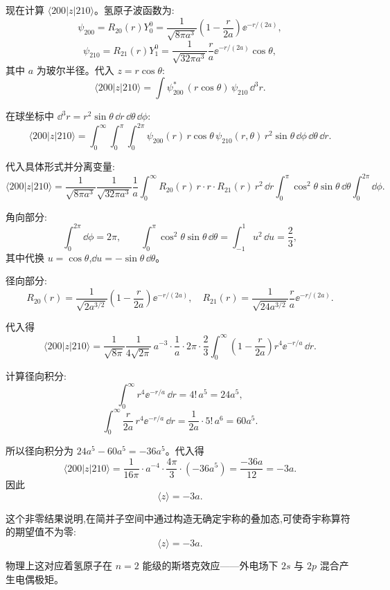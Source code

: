 \begin{solution}
	现在计算 $\langle200|z|210\rangle$。氢原子波函数为:
	\[
	\psi_{200} = R_{20}(r)Y_0^0 = \frac{1}{\sqrt{8\pi a^3}}\left(1-\frac{r}{2a}\right)\ee^{-r/(2a)},
	\]
	\[
	\psi_{210} = R_{21}(r)Y_1^0 = \frac{1}{\sqrt{32\pi a^3}}\frac{r}{a}\ee^{-r/(2a)}\cos\theta,
	\]
	其中 $a$ 为玻尔半径。代入 $z=r\cos\theta$:
	\[
	\langle200|z|210\rangle = \int \psi_{200}^*\,(r\cos\theta)\,\psi_{210}\,\dd^3 r.
	\]

	在球坐标中 $\dd^3 r = r^2\sin\theta\,\dd r\,\dd\theta\,\dd\phi$:
	\[
	\langle200|z|210\rangle = \int_0^\infty\!\!\int_0^\pi\!\!\int_0^{2\pi}
	\psi_{200}(r)\,r\cos\theta\,\psi_{210}(r,\theta)\,r^2\sin\theta\,\dd\phi\,\dd\theta\,\dd r.
	\]

	代入具体形式并分离变量:
	\[
	\langle200|z|210\rangle = \frac{1}{\sqrt{8\pi a^3}}\frac{1}{\sqrt{32\pi a^3}}\frac{1}{a}
	\int_0^\infty R_{20}(r)\,r\cdot r\cdot R_{21}(r)\,r^2\,\dd r
	\int_0^\pi \cos^2\theta\sin\theta\,\dd\theta
	\int_0^{2\pi}\dd\phi.
	\]

	角向部分:
	\[
	\int_0^{2\pi}\dd\phi = 2\pi,\qquad
	\int_0^\pi \cos^2\theta\sin\theta\,\dd\theta = \int_{-1}^{1}u^2\,\dd u = \frac23,
	\]
	其中代换 $u=\cos\theta$,$\dd u=-\sin\theta\,\dd\theta$。

	径向部分:
	\[
	R_{20}(r)=\frac{1}{\sqrt{2a^{3/2}}}\left(1-\frac{r}{2a}\right)\ee^{-r/(2a)},\quad
	R_{21}(r)=\frac{1}{\sqrt{24a^{3/2}}}\frac{r}{a}\ee^{-r/(2a)}.
	\]

	代入得
	\[
	\langle200|z|210\rangle
	=\frac{1}{\sqrt{8\pi}}\frac{1}{4\sqrt{2\pi}}\,a^{-3}\cdot\frac{1}{a}
	\cdot 2\pi\cdot\frac23
	\int_0^\infty \left(1-\frac{r}{2a}\right)r^4 \ee^{-r/a}\,\dd r.
	\]

	计算径向积分:
	\[
	\int_0^\infty r^4 \ee^{-r/a}\,\dd r = 4!\,a^5 = 24a^5,
	\]
	\[
	\int_0^\infty \frac{r}{2a}\,r^4 \ee^{-r/a}\,\dd r = \frac{1}{2a}\cdot 5!\,a^6 = 60a^5.
	\]

	所以径向积分为 $24a^5-60a^5 = -36a^5$。代入得
	\[
	\langle200|z|210\rangle
	= \frac{1}{16\pi}\cdot a^{-4}\cdot\frac{4\pi}{3}\cdot(-36a^5)
	= \frac{-36a}{12} = -3a.
	\]
	因此
	\[
	\langle z\rangle = -3a.
	\]

	这个非零结果说明,在简并子空间中通过构造无确定宇称的叠加态,可使奇宇称算符的期望值不为零:
	\[
	\boxed{\langle z\rangle = -3a}.
	\]

	物理上这对应着氢原子在 $n=2$ 能级的斯塔克效应——外电场下 $2s$ 与 $2p$ 混合产生电偶极矩。
	\end{solution}

